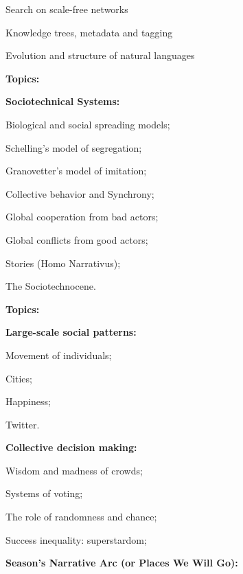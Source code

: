       Search on scale-free networks
     
      Knowledge trees, metadata and tagging
     
      Evolution and structure of natural languages
    
  


  \textbf{Topics:}


  \textbf{Sociotechnical Systems:}
    
     
      Biological and social spreading models;
     
      Schelling's model of segregation;\cite{schelling1971a}
     
      Granovetter's model of imitation;\cite{granovetter1978a}
     
      Collective behavior and Synchrony;
     
      Global cooperation from bad actors;
     
      Global conflicts from good actors;
     
      Stories (Homo Narrativus);
     
      The Sociotechnocene.
    
  


  \textbf{Topics:}

  \textbf{Large-scale social patterns:}
    
     
      Movement of individuals;
     
      Cities;
     
      Happiness;
     
      Twitter.
    
  

  \textbf{Collective decision making:}
    
     
      Wisdom and madness of crowds;
     
      Systems of voting;
     
      The role of randomness and chance;
     
      Success inequality: superstardom;
    
  





  \textbf{Season's Narrative Arc (or Places We Will Go):}
    

